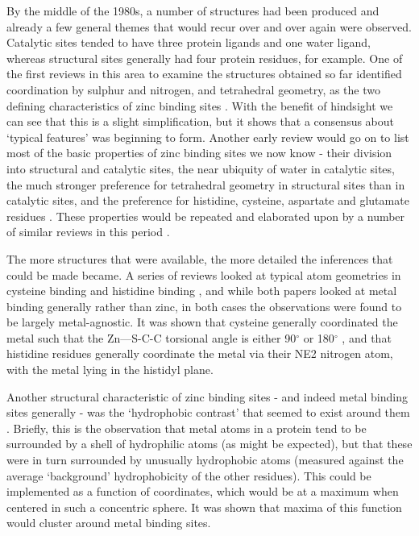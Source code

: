 By the middle of the 1980s, a number of structures had been produced and already a few general themes that would recur over and over again were observed. Catalytic sites tended to have three protein ligands and one water ligand, whereas structural sites generally had four protein residues, for example. One of the first reviews in this area to examine the structures obtained so far identified coordination by sulphur and nitrogen, and tetrahedral geometry, as the two defining characteristics of zinc binding sites \cite{williams1987biochemistry}. With the benefit of hindsight we can see that this is a slight simplification, but it shows that a consensus about `typical features' was beginning to form. Another early review would go on to list most of the basic properties of zinc binding sites we now know - their division into structural and catalytic sites, the near ubiquity of water in catalytic sites, the much stronger preference for tetrahedral geometry in structural sites than in catalytic sites, and the preference for histidine, cysteine, aspartate and glutamate residues \cite{vallee1990zinc}. These properties would be repeated and elaborated upon by a number of similar reviews in this period \cite{tainer1991metal,vallee1992functional,coleman1992zinc}.

The more structures that were available, the more detailed the inferences that could be made became. A series of reviews looked at typical atom geometries in cysteine binding \cite{chakrabarti1989geometry} and histidine binding \cite{chakrabarti1990geometry}, and while both papers looked at metal binding generally rather than zinc, in both cases the observations were found to be largely metal-agnostic. It was shown that cysteine generally coordinated the metal such that the Zn---S-C-C torsional angle is either 90$^\circ$ or 180$^\circ$ , and that histidine residues generally coordinate the metal via their NE2 nitrogen atom, with the metal lying in the histidyl plane.

Another structural characteristic of zinc binding sites - and indeed metal binding sites generally - was the `hydrophobic contrast' that seemed to exist around them \cite{yamashita1990metal,gregory1993prediction}. Briefly, this is the observation that metal atoms in a protein tend to be surrounded by a shell of hydrophilic atoms (as might be expected), but that these were in turn surrounded by unusually hydrophobic atoms (measured against the average `background' hydrophobicity of the other residues). This could be implemented as a function of coordinates, which would be at a maximum when centered in such a concentric sphere. It was shown that maxima of this function would cluster around metal binding sites.

